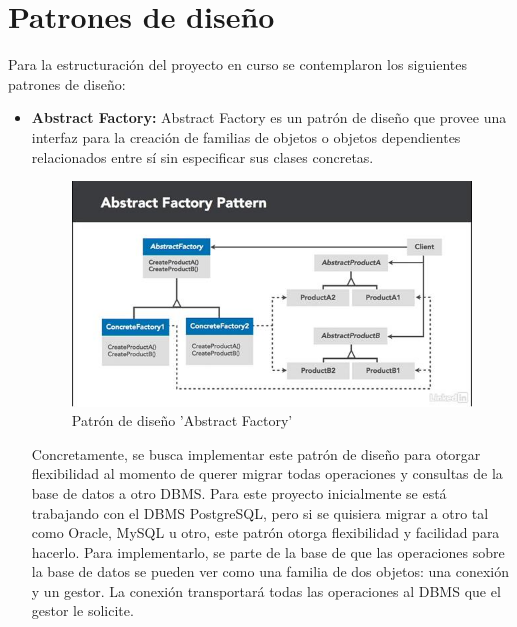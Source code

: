 \chapter{Patrones de diseño}
Para la estructuración del proyecto en curso se contemplaron los siguientes patrones de diseño:
\leavevmode
\linebreak
\begin{itemize}
	\item{\textbf{Abstract Factory:} Abstract Factory es un patrón de diseño que provee una interfaz para la creación de familias de objetos o objetos dependientes relacionados entre sí sin especificar sus clases concretas.
	\begin{figure}[h!]
	\centering
		\includegraphics[scale=0.8]{diseno/patrones/imgs/abstractfactory}
		\caption{Patrón de diseño 'Abstract Factory'}
	\end{figure}
	Concretamente, se busca implementar este patrón de diseño para otorgar flexibilidad al momento de querer migrar todas operaciones y consultas de la base de datos a otro DBMS. Para este proyecto inicialmente se está trabajando con el DBMS PostgreSQL, pero si se quisiera migrar a otro tal como Oracle, MySQL u otro, este patrón otorga flexibilidad y facilidad para hacerlo. Para implementarlo, se parte de la base de que las operaciones sobre la base de datos se pueden ver como una familia de dos objetos: una conexión y un gestor. La conexión transportará todas las operaciones al DBMS que el gestor le solicite.
	\begin{figure}[h!]
	\centering

\end{figure}}
\end{itemize}
